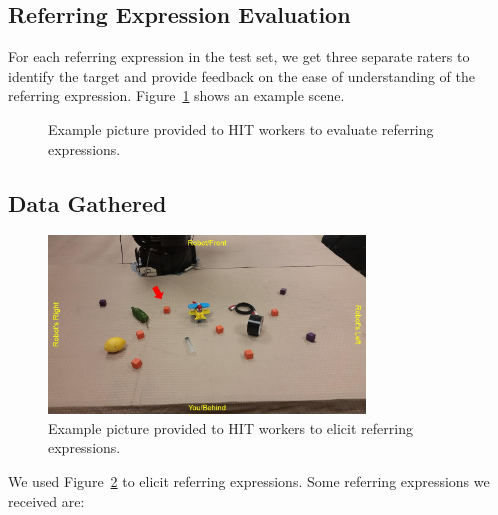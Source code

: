 \documentclass[letterpaper,10pt]{article}
\begin{document}
\subsection{Referring Expression Evaluation}

For each referring expression in the test set, we get three separate raters to identify the target and provide feedback on the ease of understanding of the referring expression. Figure~\ref{fig:ref_expr_eval_pic} shows an example scene.

\begin{figure}[h!tb]
  \centering
  \caption{Example picture provided to HIT workers to evaluate referring expressions.}
  \label{fig:ref_expr_eval_pic}
\end{figure}

\subsection{Data Gathered}

\begin{figure}[h!tb]
  \centering
    \includegraphics[width=0.75\textwidth]{ref_expr_examples_pic}
  \caption{Example picture provided to HIT workers to elicit referring expressions.}
  \label{fig:ref_expr_examples_pic}
\end{figure}

We used Figure~\ref{fig:ref_expr_examples_pic} to elicit referring expressions. Some referring expressions we received are:
\end{document}
